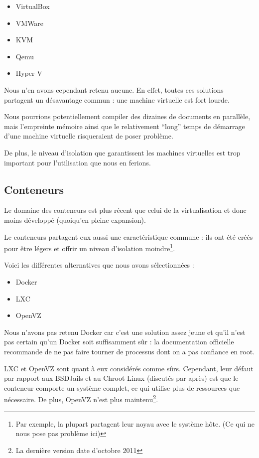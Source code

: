 \documentclass[10pt,a4paper]{article}
\begin{document}
\begin{itemize}
	\item{VirtualBox}
	\item{VMWare}
    \item{KVM}
    \item{Qemu}
    \item{Hyper-V}
\end{itemize}

Nous n'en avons cependant retenu aucune. En effet, toutes ces solutions partagent un désavantage commun : une machine virtuelle est fort lourde.

Nous pourrions potentiellement compiler des dizaines de documents en parallèle, mais l'empreinte mémoire ainsi que le relativement ``long'' temps de démarrage d'une machine virtuelle risqueraient de poser problème.

De plus, le niveau d'isolation que garantissent les machines virtuelles est trop important pour l'utilisation que nous en ferions.

\subsection{Conteneurs}
Le domaine des conteneurs est plus récent que celui de la virtualisation et donc moins développé (quoiqu'en pleine expansion).

Le conteneurs partagent eux aussi une caractéristique commune : ils ont été créés pour être légers et offrir un niveau d'isolation moindre\footnote{Par exemple, la plupart partagent leur noyau avec le système hôte. (Ce qui ne nous pose pas problème ici)}.

Voici les différentes alternatives que nous avons sélectionnées :

\begin{itemize}
    \item{Docker}
    \item{LXC}
    \item{OpenVZ}
\end{itemize}

Nous n'avons pas retenu Docker car c'est une solution assez jeune et qu'il n'est pas certain qu'un Docker soit suffisamment sûr : la documentation officielle recommande de ne pas faire tourner de processus dont on a pas confiance en root.

LXC et OpenVZ sont quant à eux considérés comme sûrs.
Cependant, leur défaut par rapport aux BSDJails et au Chroot Linux (discutés par après) est que le conteneur comporte un système complet, ce qui utilise plus de ressources que nécessaire.
De plus, OpenVZ n'est plus maintenu\footnote{La dernière version date d'octobre 2011}.
\end{document}

